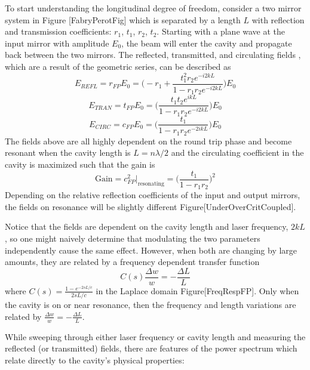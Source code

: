 		To start understanding the longitudinal degree of freedom, consider a two mirror system in Figure [FabryPerotFig] which is separated by a length $L$ with reflection and transmission coefficients: $r_1$, $t_1$, $r_2$, $t_2$.	
		Starting with a plane wave at the input mirror with amplitude $E_0$, the beam will enter the cavity and propagate back between the two mirrors.  The reflected, transmitted, and circulating fields \cite{Saulson}, which are a result of the geometric series, can be described as
		\begin{equation}\label{r_FP}
		E_{REFL} = r_{FP} E_0 = \bigg(-r_1 + \frac{t_1^2 r_2  e^{-i2kL}}{1-r_1 r_2 e^{-i2kL}} \bigg) E_0
		\end{equation}
		\begin{equation}\label{t_FP}
		E_{TRAN} = t_{FP} E_{0} = \bigg( \frac{t_1 t_2 e^{ikL}}{1-r_1 r_2 e^{-i2kL}}\bigg) E_0
		\end{equation}
		\begin{equation}\label{c_FP}
		E_{CIRC} = c_{FP} E_0 = \bigg(\frac{t_1}{1- r_1 r_2 e^{-2ikL}} \bigg) E_0
		\end{equation}
		The fields above are all highly dependent on the round trip phase and become resonant when the cavity length is $L = n \lambda / 2$ and the circulating coefficient in the cavity is maximized such that the gain is
		\begin{equation}
		\text{Gain} = c^2_{FP} \vert_{\text{resonating}} = \bigg( \frac{t_1}{1-r_1 r_2}\bigg)^2
		\end{equation}
		Depending on the relative reflection coefficients of the input and output mirrors, the fields on resonance will be slightly different Figure[UnderOverCritCoupled].
		
		Notice that the fields are dependent on the cavity length and laser frequency, $2kL$, so one might naively determine that modulating the two parameters independently cause the same effect.  However, when both are changing by large amounts, they are related by a frequency dependent transfer function 
		\begin{equation}
		C(s) \frac{\Delta w}{w} = -\frac{\Delta L}{L}
		\end{equation}
		where $C(s) = \frac{1-e^{-2sL/c}}{2sL/c}$ in the Laplace domain Figure[FreqRespFP]. Only when the cavity is on or near resonance, then the frequency and length variations are related by $\frac{\Delta w}{w} = -\frac{\Delta L}{L}$.
		
		While sweeping through either laser frequency or cavity length and measuring the reflected (or transmitted) fields, there are features of the power spectrum which relate directly to the cavity's physical properties:
		
